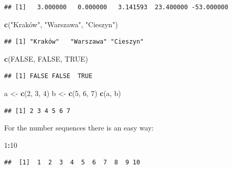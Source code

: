 \documentclass[
]{book}
\newenvironment{Shaded}{\begin{snugshade}}{\end{snugshade}}
\newcommand{\DecValTok}[1]{\textcolor[rgb]{0.00,0.00,0.81}{#1}}
\newcommand{\KeywordTok}[1]{\textcolor[rgb]{0.13,0.29,0.53}{\textbf{#1}}}
\newcommand{\NormalTok}[1]{#1}
\newcommand{\OperatorTok}[1]{\textcolor[rgb]{0.81,0.36,0.00}{\textbf{#1}}}
\newcommand{\OtherTok}[1]{\textcolor[rgb]{0.56,0.35,0.01}{#1}}
\newcommand{\StringTok}[1]{\textcolor[rgb]{0.31,0.60,0.02}{#1}}
\begin{document}
\begin{verbatim}
## [1]   3.000000   0.000000   3.141593  23.400000 -53.000000
\end{verbatim}

\begin{Shaded}
\begin{Highlighting}[]
\KeywordTok{c}\NormalTok{(}\StringTok{"Kraków", "}\NormalTok{Warszawa}\StringTok{", "}\NormalTok{Cieszyn}\StringTok{")}
\end{Highlighting}
\end{Shaded}

\begin{verbatim}
## [1] "Kraków"   "Warszawa" "Cieszyn"
\end{verbatim}

\begin{Shaded}
\begin{Highlighting}[]
\KeywordTok{c}\NormalTok{(}\OtherTok{FALSE}\NormalTok{, }\OtherTok{FALSE}\NormalTok{, }\OtherTok{TRUE}\NormalTok{)}
\end{Highlighting}
\end{Shaded}

\begin{verbatim}
## [1] FALSE FALSE  TRUE
\end{verbatim}

\begin{Shaded}
\begin{Highlighting}[]
\NormalTok{a <-}\StringTok{ }\KeywordTok{c}\NormalTok{(}\DecValTok{2}\NormalTok{, }\DecValTok{3}\NormalTok{, }\DecValTok{4}\NormalTok{)}
\NormalTok{b <-}\StringTok{ }\KeywordTok{c}\NormalTok{(}\DecValTok{5}\NormalTok{, }\DecValTok{6}\NormalTok{, }\DecValTok{7}\NormalTok{)}
\KeywordTok{c}\NormalTok{(a, b)}
\end{Highlighting}
\end{Shaded}

\begin{verbatim}
## [1] 2 3 4 5 6 7
\end{verbatim}

For the number sequences there is an easy way:

\begin{Shaded}
\begin{Highlighting}[]
\DecValTok{1}\OperatorTok{:}\DecValTok{10}
\end{Highlighting}
\end{Shaded}

\begin{verbatim}
##  [1]  1  2  3  4  5  6  7  8  9 10
\end{verbatim}
\end{document}
